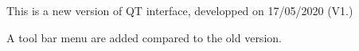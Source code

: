 This is a new version of QT interface, developped on 17/05/2020 (V1.)

A tool bar menu are added compared to the old version. 
